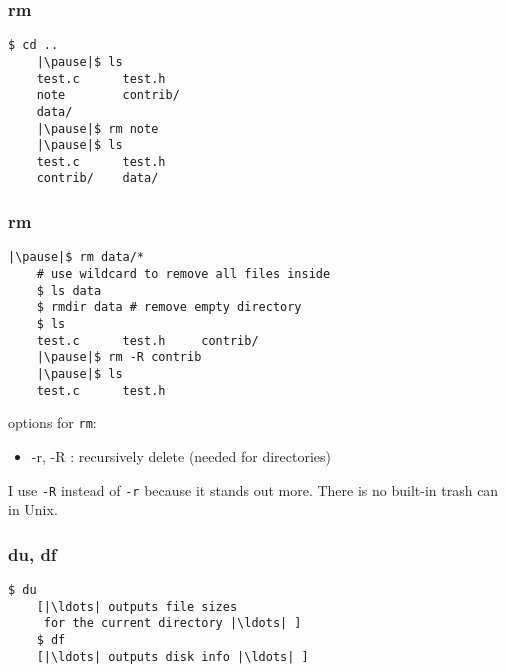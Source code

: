 \documentclass[%
        hyperref={%
                pdfauthor={Zakariyya Mughal},%
                pdfpagemode={None},pdfpagelayout={SinglePage}}%
        xcolor={x11names},%
]{beamer}
\begin{document}
\begin{frame}[fragile]
	\frametitle{rm}
	\begin{lstlisting}[escapeinside=||]
	$ cd ..
	|\pause|$ ls
	test.c      test.h
	note        contrib/
	data/
	|\pause|$ rm note
	|\pause|$ ls
	test.c      test.h
	contrib/    data/
	\end{lstlisting}
\end{frame}
\begin{frame}[fragile]
	\frametitle{rm}
	\begin{lstlisting}[escapeinside=||]
	|\pause|$ rm data/*
	# use wildcard to remove all files inside
	$ ls data
	$ rmdir data # remove empty directory
	$ ls
	test.c      test.h     contrib/
	|\pause|$ rm -R contrib
	|\pause|$ ls
	test.c      test.h
	\end{lstlisting}

	\pause
	options for \texttt{rm}:
	\begin{itemize}
		\item -r, -R : recursively delete (needed for directories)
	\end{itemize}

	I use \texttt{-R} instead of \texttt{-r} because it stands
	out more. There is no built-in trash can in Unix.
\end{frame}
\begin{frame}[fragile]
	\frametitle{du, df}
	\begin{lstlisting}[escapeinside=||]
	$ du
	[|\ldots| outputs file sizes
	 for the current directory |\ldots| ]
	$ df
	[|\ldots| outputs disk info |\ldots| ]
	\end{lstlisting}
\end{frame}
\end{document}
